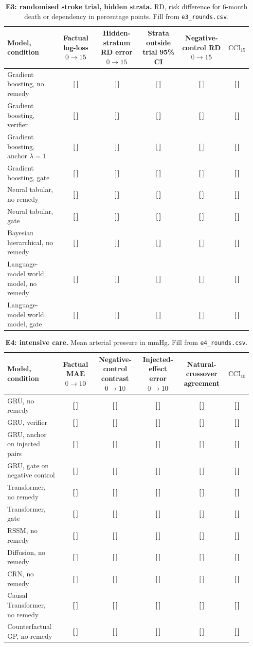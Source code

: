 \documentclass[11pt,a4paper]{article}
\newcommand{\T}{{\color{red}\textbf{[\,]}}}
\newcommand{\CCI}{\mathrm{CCI}}
\begin{document}
\FloatBarrier
\begin{table}[!htbp]\centering\footnotesize
\caption{\textbf{E3: randomised stroke trial, hidden strata.} RD, risk difference for 6-month death or dependency in percentage points. Fill from \texttt{e3\_rounds.csv}.}
\begin{tabularx}{\textwidth}{@{}p{3.9cm} C C C C C@{}}\toprule
Model, condition & Factual log-loss $0\to15$ & Hidden-stratum RD error $0\to15$ & Strata outside trial 95\% CI & Negative-control RD $0\to15$ & $\CCI_{15}$\\\midrule
Gradient boosting, no remedy & \T & \T & \T & \T & \T\\
Gradient boosting, verifier & \T & \T & \T & \T & \T\\
Gradient boosting, anchor $\lambda=1$ & \T & \T & \T & \T & \T\\
Gradient boosting, gate & \T & \T & \T & \T & \T\\
Neural tabular, no remedy & \T & \T & \T & \T & \T\\
Neural tabular, gate & \T & \T & \T & \T & \T\\
Bayesian hierarchical, no remedy & \T & \T & \T & \T & \T\\
Language-model world model, no remedy & \T & \T & \T & \T & \T\\
Language-model world model, gate & \T & \T & \T & \T & \T\\
\bottomrule\end{tabularx}
\end{table}
\FloatBarrier
\begin{table}[!htbp]\centering\footnotesize
\caption{\textbf{E4: intensive care.} Mean arterial pressure in mmHg. Fill from \texttt{e4\_rounds.csv}.}
\begin{tabularx}{\textwidth}{@{}p{3.9cm} C C C C C@{}}\toprule
Model, condition & Factual MAE $0\to10$ & Negative-control contrast $0\to10$ & Injected-effect error $0\to10$ & Natural-crossover agreement & $\CCI_{10}$\\\midrule
GRU, no remedy & \T & \T & \T & \T & \T\\
GRU, verifier & \T & \T & \T & \T & \T\\
GRU, anchor on injected pairs & \T & \T & \T & \T & \T\\
GRU, gate on negative control & \T & \T & \T & \T & \T\\
Transformer, no remedy & \T & \T & \T & \T & \T\\
Transformer, gate & \T & \T & \T & \T & \T\\
RSSM, no remedy & \T & \T & \T & \T & \T\\
Diffusion, no remedy & \T & \T & \T & \T & \T\\
CRN, no remedy & \T & \T & \T & \T & \T\\
Causal Transformer, no remedy & \T & \T & \T & \T & \T\\
Counterfactual GP, no remedy & \T & \T & \T & \T & \T\\
\bottomrule\end{tabularx}
\end{table}
\end{document}
